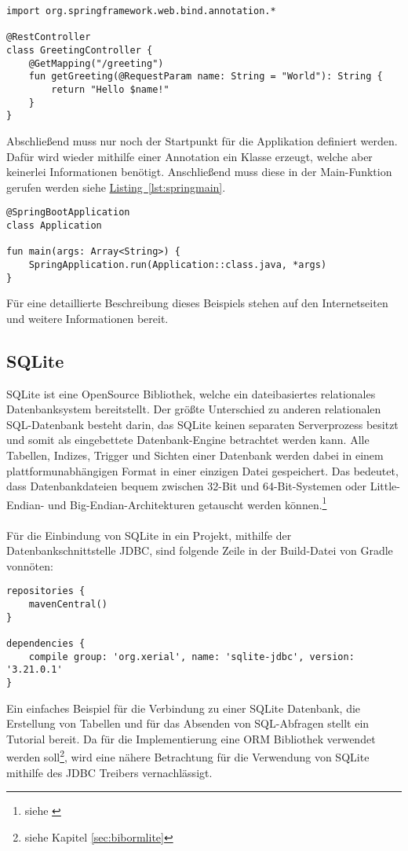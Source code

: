 \begin{lstlisting}[style=lstStyleFramed, caption={Beispiel: Spring Controller}, label=lst:springcontroller]
import org.springframework.web.bind.annotation.*

@RestController
class GreetingController {
	@GetMapping("/greeting")
	fun getGreeting(@RequestParam name: String = "World"): String {
		return "Hello $name!"
	}
}
\end{lstlisting}
Abschließend muss nur noch der Startpunkt für die Applikation definiert werden. Dafür wird wieder mithilfe einer Annotation ein Klasse erzeugt, welche aber keinerlei Informationen benötigt. Anschließend muss diese in der Main-Funktion gerufen werden siehe \hyperref[lst:springmain]{Listing~\ref{lst:springmain}}.
\begin{lstlisting}[style=lstStyleFramed, caption={Beispiel: Spring Application Class}, label=lst:springmain]
@SpringBootApplication
class Application

fun main(args: Array<String>) {
	SpringApplication.run(Application::class.java, *args)
}
\end{lstlisting}
Für eine detaillierte Beschreibung dieses Beispiels stehen auf den Internetseiten \cite{springTutorialKotlin} und \cite{springTutorial} weitere Informationen bereit.

\subsection{SQLite}\label{sec:bibsqlite}
SQLite ist eine OpenSource Bibliothek, welche ein dateibasiertes relationales Datenbanksystem bereitstellt. Der größte Unterschied zu anderen relationalen SQL-Datenbank besteht darin, das SQLite keinen separaten Serverprozess besitzt und somit als eingebettete Datenbank-Engine betrachtet werden kann. Alle Tabellen, Indizes, Trigger und Sichten einer Datenbank werden dabei in einem plattformunabhängigen Format in einer einzigen Datei gespeichert. Das bedeutet, dass Datenbankdateien bequem zwischen 32-Bit und 64-Bit-Systemen oder Little-Endian- und Big-Endian-Architekturen getauscht werden können.\footnote{siehe \cite{sqliteAbout}}\\
\\
Für die Einbindung von SQLite in ein Projekt, mithilfe der Datenbankschnittstelle \gls{JDBC}, sind folgende Zeile in der Build-Datei von Gradle vonnöten:
\begin{lstlisting}[style=lstStyleFramed, caption={Einbindung der Bibliothek SQLite mithilfe von Gradle}]
repositories {
	mavenCentral()
}

dependencies {
	compile group: 'org.xerial', name: 'sqlite-jdbc', version: '3.21.0.1'
}
\end{lstlisting}
Ein einfaches Beispiel für die Verbindung zu einer SQLite Datenbank, die Erstellung von Tabellen und für das Absenden von SQL-Abfragen stellt \cite{sqliteJDBCTutorial} ein Tutorial bereit. Da für die Implementierung eine \gls{ORM} Bibliothek verwendet werden soll\footnote{siehe Kapitel \ref{sec:bibormlite}}, wird eine nähere Betrachtung für die Verwendung von SQLite mithilfe des \gls{JDBC} Treibers vernachlässigt.

